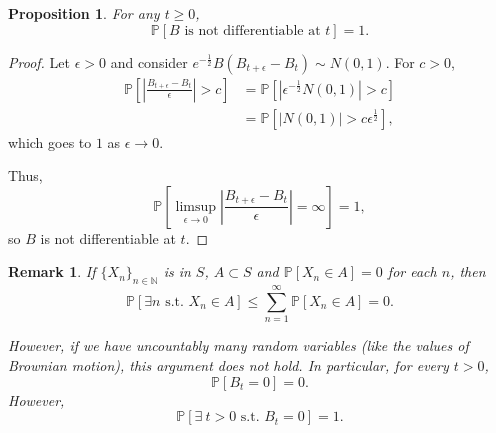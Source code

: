 \documentclass{tufte-handout}
\newcommand*\N{\mathbb{N}}
\renewcommand*\P{\mathbb{P}}
\newtheorem{rmk}[thm]{Remark}
\newtheorem{prop}[thm]{Proposition}
\theoremstyle{definition}
\begin{document}
\begin{prop}
	For any $t \ge 0$, \[
		\P\left[B \text{ is not differentiable at $t$}\right] = 1
	.\]
\end{prop}

\begin{proof}
	Let $\epsilon > 0$ and consider $e^{-\frac{1}{2}} B\left( B_{t+\epsilon} - B_t \right) \sim  N(0,1)$.
	For $c >0$,
	\begin{align*}
		\P\left[\left| \frac{B_{t+\epsilon} - B_t}{\epsilon} \right| > c\right] &= \P\left[\left| \epsilon^{-\frac{1}{2}}N(0,1) \right| > c\right]  \\
		&= \P\left[\left| N(0,1) \right| > c \epsilon^{\frac{1}{2}}\right]			
	,\end{align*}
	which goes to $1$ as $\epsilon \to 0$.

	Thus, \[
		\P\left[\limsup\limits_{\epsilon \to 0} \left| \frac{B_{t+\epsilon} - B_t}{\epsilon} \right| = \infty\right] = 1
	,\] so $B$ is not differentiable at $t$.
\end{proof}

\begin{rmk}
	If $\{X_n\}_{n\in \N}$ is in $S$, $A \subset S$ and $\P\left[X_n \in A\right] = 0$ for each $n$, then \[
		\P\left[\exists n \text{ s.t. } X_n \in A\right] \le \sum\limits_{n=1}^{\infty} \P\left[X_n \in A\right] =0
	.\] 

	However, if we have uncountably many random variables (like the values of Brownian motion), this argument does not hold.
	In particular, for every $t > 0$, \[
		\P\left[B_t = 0\right] = 0
	.\] However, \[
		\P\left[\exists\ t > 0 \text{ s.t. } B_t = 0\right] =1 
	.\] 
\end{rmk}
\end{document}

